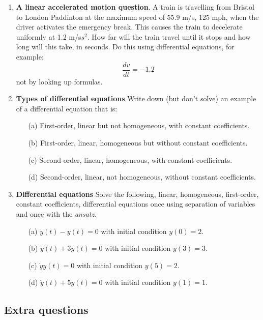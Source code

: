 \documentclass[11pt,a4paper]{scrartcl}
\begin{document}
\begin{enumerate}

\item \textbf{A linear accelerated motion question}. A train is travelling from Bristol to London Paddinton at the maximum speed of 55.9 m/s, 125 mph, when the driver activates the emergency break. This causes the train to decelerate uniformly at 1.2 m/s$s^2$. How far will the train travel until it stops and how long will this take, in seconds. Do this using differential equations, for example:
  \begin{equation}
    \frac{dv}{dt}=-1.2
  \end{equation}
  not by looking up formulas.

\item \textbf{Types of differential equations}
  Write down (but don't solve) an example of a differential equation that is:
  \begin{itemize}
  \item[(a)] First-order, linear but not homogeneous, with constant coefficients.
  \item[(b)] First-order, linear, homogeneous but without constant coefficients.
  \item[(c)] Second-order, linear, homogeneous, with constant coefficients.
  \item[(d)] Second-order, linear, not homogeneous, without constant coefficients.
  \end{itemize}
	
\item \textbf{Differential equations} Solve the following, linear,
  homogeneous, first-order, constant coefficients, differential
  equations once using separation of variables and once with the
  \emph{ansatz}.
	\begin{itemize}
		\item[(a)] $\dot{y}(t) - y(t) = 0$ with initial condition $y(0) = 2$.
		\item[(b)] $\dot{y}(t) + 3y(t) = 0$ with initial condition $y(3) = 3$.
		\item[(c)] $\dot{y}y(t) = 0$ with  initial condition $y(5) = 2$.
		\item[(d)] $\dot{y}(t) + 5y(t) = 0$ with initial condition
                  $y(1) = 1$.
	\end{itemize}

\end{enumerate}
        
\subsection*{Extra questions}
\end{document}
